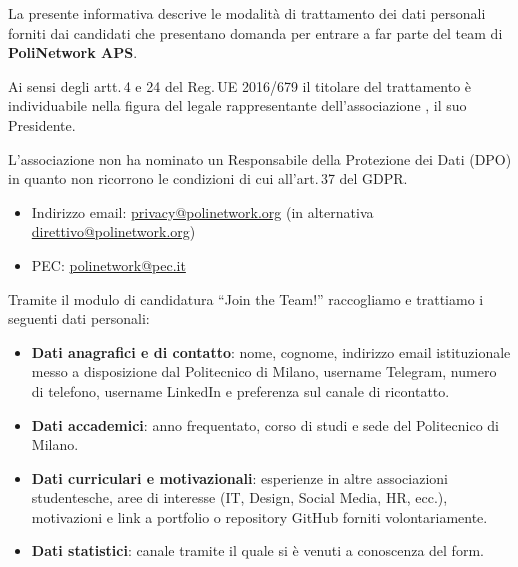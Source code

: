 \documentclass[legal]{core/polinetwork}
\begin{document}
\thispagestyle{firstpage}

\pnMakeHeader
\pnMakeMetadata


La presente informativa descrive le modalità di trattamento dei dati
personali forniti dai candidati che presentano domanda per entrare a far
parte del team di \textbf{PoliNetwork APS}.


Ai sensi degli artt.\,4 e 24 del Reg.\,UE 2016/679 il titolare del
trattamento è individuabile nella figura del legale rappresentante
dell'associazione , il suo Presidente.

L'associazione non ha nominato un Responsabile della Protezione dei
Dati (DPO) in quanto non ricorrono le condizioni di cui all'art.\,37
del GDPR.


\begin{itemize}
  \item Indirizzo email:
    \href{mailto:privacy@polinetwork.org}{privacy@polinetwork.org}
    (in alternativa
    \href{mailto:direttivo@polinetwork.org}{direttivo@polinetwork.org})
  \item PEC:
    \href{mailto:polinetwork@pec.it}{polinetwork@pec.it}
\end{itemize}


Tramite il modulo di candidatura ``Join the Team!'' raccogliamo e
trattiamo i seguenti dati personali:

\begin{itemize}
  \item \textbf{Dati anagrafici e di contatto}: nome, cognome,
    indirizzo email istituzionale messo a disposizione dal
    Politecnico di Milano, username Telegram, numero di telefono,
    username LinkedIn e preferenza sul canale di ricontatto.
  \item \textbf{Dati accademici}: anno frequentato, corso di studi
    e sede del Politecnico di Milano.
  \item \textbf{Dati curriculari e motivazionali}: esperienze
    in altre associazioni studentesche, aree di interesse (IT,
    Design, Social Media, HR, ecc.), motivazioni e link a
    portfolio o repository GitHub forniti volontariamente.
  \item \textbf{Dati statistici}: canale tramite il quale si è
    venuti a conoscenza del form.
\end{itemize}
\end{document}
